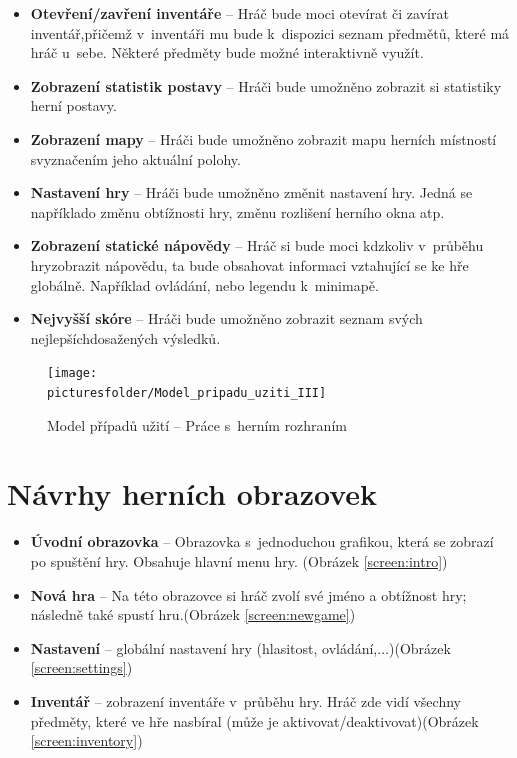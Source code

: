 \documentclass[12pt,a4paper]{article}
\def\picturesfolder{obrazky}
\begin{document}
\begin {itemize}
\item{\textbf{Otevření/zavření inventáře} --  Hráč bude moci otevírat či zavírat
  inventář,přičemž v~inventáři mu bude k~dispozici seznam předmětů, které má
  hráč u~sebe.  Některé předměty bude možné interaktivně využít.}
\item{\textbf{Zobrazení statistik postavy} --  Hráči bude umožněno zobrazit si
  statistiky herní postavy.}
\item{\textbf{Zobrazení mapy} --  Hráči bude umožněno zobrazit mapu herních
  místností svyznačením jeho aktuální polohy.}
\item{\textbf{Nastavení hry} --  Hráči bude umožněno změnit nastavení hry. Jedná
  se napříklado změnu obtížnosti hry, změnu rozlišení herního okna atp.}
\item{\textbf{Zobrazení statické nápovědy} --  Hráč si bude moci kdzkoliv
v~průběhu hryzobrazit nápovědu, ta bude obsahovat informaci vztahující se ke hře
  globálně.  Například ovládání, nebo legendu k~minimapě.}
\item{\textbf{Nejvyšší skóre} --  Hráči bude umožněno zobrazit seznam svých
  nejlepšíchdosažených výsledků.}
\end {itemize}

\begin{figure}
\begin{center}
  \texttt{[image: \\picturesfolder/Model\_pripadu\_uziti\_III]}
  \caption{Model případů užití -- Práce s~herním rozhraním}
  \label{uc:rozhrani}
\end{center}
\end{figure}

\section{Návrhy herních obrazovek}
\begin{itemize}
  \item{\textbf{Úvodní obrazovka} -- Obrazovka s~jednoduchou grafikou, která se
    zobrazí po spuštění hry. Obsahuje hlavní menu hry. (Obrázek
    \ref{screen:intro})}
  \item{\textbf{Nová hra} -- Na této obrazovce si hráč zvolí své jméno a
    obtížnost hry; následně také spustí hru.(Obrázek \ref{screen:newgame})}
  \item{\textbf{Nastavení} -- globální nastavení hry (hlasitost,
    ovládání,$\dots$)(Obrázek \ref{screen:settings})}
  \item{\textbf{Inventář} -- zobrazení inventáře v~průběhu hry. Hráč zde vidí
    všechny předměty, které ve hře nasbíral (může je
    aktivovat/deaktivovat)(Obrázek \ref{screen:inventory})}
\end{itemize}
\end{document}
